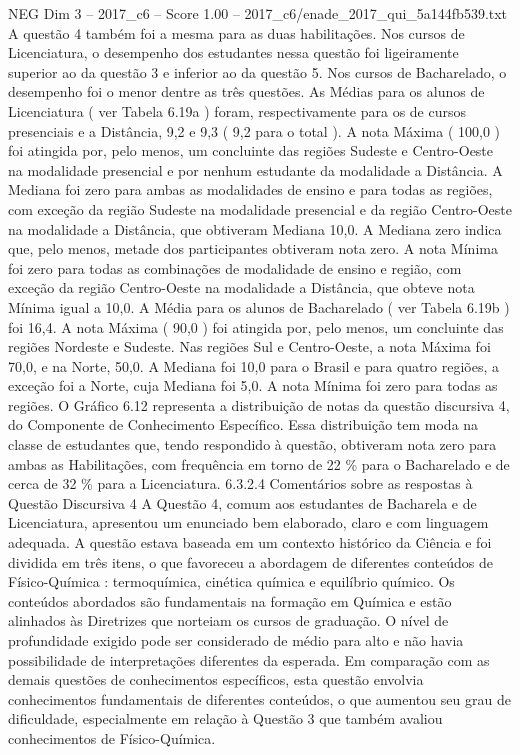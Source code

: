 \begin{textsample}{NEG Dim 3 – 2017\_c6 – Score 1.00 – 2017\_c6/enade\_2017\_qui\_5a144fb539.txt}
A questão 4 também foi a mesma para as duas habilitações.
Nos cursos de Licenciatura, o desempenho dos estudantes nessa questão foi ligeiramente superior ao da questão 3 e inferior ao da questão 5.
Nos cursos de Bacharelado, o desempenho foi o menor dentre as três questões.
As Médias para os alunos de Licenciatura ( ver Tabela 6.19a ) foram, respectivamente para os de cursos presenciais e a Distância, 9,2 e 9,3 ( 9,2 para o total ).
A nota Máxima ( 100,0 ) foi atingida por, pelo menos, um concluinte das regiões Sudeste e Centro-Oeste na modalidade presencial e por nenhum estudante da modalidade a Distância.
A Mediana foi zero para ambas as modalidades de ensino e para todas as regiões, com exceção da região Sudeste na modalidade presencial e da região Centro-Oeste na modalidade a Distância, que obtiveram Mediana 10,0.
A Mediana zero indica que, pelo menos, metade dos participantes obtiveram nota zero.
A nota Mínima foi zero para todas as combinações de modalidade de ensino e região, com exceção da região Centro-Oeste na modalidade a Distância, que obteve nota Mínima igual a 10,0.
A Média para os alunos de Bacharelado ( ver Tabela 6.19b ) foi 16,4.
A nota Máxima ( 90,0 ) foi atingida por, pelo menos, um concluinte das regiões Nordeste e Sudeste.
Nas regiões Sul e Centro-Oeste, a nota Máxima foi 70,0, e na Norte, 50,0.
A Mediana foi 10,0 para o Brasil e para quatro regiões, a exceção foi a Norte, cuja Mediana foi 5,0.
A nota Mínima foi zero para todas as regiões.
O Gráfico 6.12 representa a distribuição de notas da questão discursiva 4, do Componente de Conhecimento Específico.
Essa distribuição tem moda na classe de estudantes que, tendo respondido à questão, obtiveram nota zero para ambas as Habilitações, com frequência em torno de 22 \% para o Bacharelado e de cerca de 32 \% para a Licenciatura. 6.3.2.4 Comentários sobre as respostas à Questão Discursiva 4 A Questão 4, comum aos estudantes de Bacharela e de Licenciatura, apresentou um enunciado bem elaborado, claro e com linguagem adequada.
A questão estava baseada em um contexto histórico da Ciência e foi dividida em três itens, o que favoreceu a abordagem de diferentes conteúdos de Físico-Química : termoquímica, cinética química e equilíbrio químico.
Os conteúdos abordados são fundamentais na formação em Química e estão alinhados às Diretrizes que norteiam os cursos de graduação.
O nível de profundidade exigido pode ser considerado de médio para alto e não havia possibilidade de interpretações diferentes da esperada.
Em comparação com as demais questões de conhecimentos específicos, esta questão envolvia conhecimentos fundamentais de diferentes conteúdos, o que aumentou seu grau de dificuldade, especialmente em relação à Questão 3 que também avaliou conhecimentos de Físico-Química.

\end{textsample}
